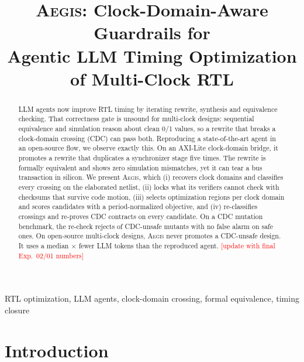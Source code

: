 \documentclass[conference,10pt]{IEEEtran}
\newcommand{\aegis}{\textsc{Aegis}}
\newcommand{\pend}[1]{\textcolor{red}{[#1]}}
\begin{document}
\title{\aegis: Clock-Domain-Aware Guardrails for\\Agentic LLM Timing Optimization of Multi-Clock RTL}
\author{\IEEEauthorblockA{Submission ID: \pend{xxx}}}
\maketitle

\begin{abstract}
LLM agents now improve RTL timing by iterating rewrite, synthesis and equivalence checking. That correctness gate
is unsound for multi-clock designs: sequential equivalence and simulation reason about clean 0/1 values, so a
rewrite that breaks a clock-domain crossing (CDC) can pass both. Reproducing a state-of-the-art agent in an
open-source flow, we observe exactly this. On an AXI-Lite clock-domain bridge, it promotes a rewrite that duplicates
a synchronizer stage five times. The rewrite is formally equivalent and shows zero simulation mismatches, yet it can
tear a bus transaction in silicon. We present \aegis{}, which (i) recovers clock domains and classifies every
crossing on the elaborated netlist, (ii) locks what its verifiers cannot check with checksums that survive code
motion, (iii) selects optimization regions per clock domain and scores candidates with a period-normalized
objective, and (iv) re-classifies crossings and re-proves CDC contracts on every candidate. On a CDC mutation
benchmark, the re-check rejects \NMutUnsafeCaught{} of \NMutUnsafe{} CDC-unsafe mutants with no
false alarm on \NMutSafe{} safe ones. On \NMcDesigns{} open-source multi-clock designs, \aegis{} never promotes a
CDC-unsafe design. It uses a median \TokRatioMedian$\times$ fewer LLM tokens than the reproduced agent.
\pend{update with final Exp.~02/01 numbers}
\end{abstract}

\begin{IEEEkeywords}
RTL optimization, LLM agents, clock-domain crossing, formal equivalence, timing closure
\end{IEEEkeywords}

\section{Introduction}
\end{document}
